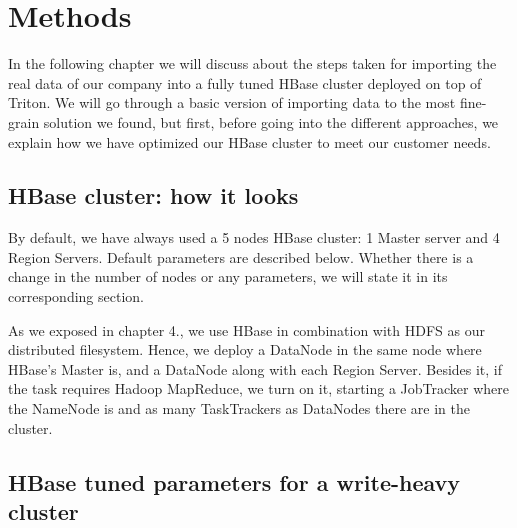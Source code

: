 \chapter{Methods}
\label{chapter:methods}

In the following chapter we will discuss about the steps taken for importing the real data of our company into a fully tuned HBase cluster deployed on top of Triton. We will go through a basic version of importing data to the most fine-grain solution we found, but first, before going into the different approaches, we explain how we have optimized our HBase cluster to meet our customer needs.

\section{HBase cluster: how it looks}

By default, we have always used a 5 nodes HBase cluster: 1 Master server and 4 Region Servers. Default parameters are described below. Whether there is a change in the number of nodes or any parameters, we will state it in its corresponding section.
\par
As we exposed in chapter 4., we use HBase in combination with HDFS as our distributed filesystem. Hence, we deploy a DataNode in the same node where HBase's Master is, and a DataNode along with each Region Server. Besides it, if the task requires Hadoop MapReduce, we turn on it, starting a JobTracker where the NameNode is and as many TaskTrackers as DataNodes there are in the cluster.

\section{HBase tuned parameters for a write-heavy cluster}

